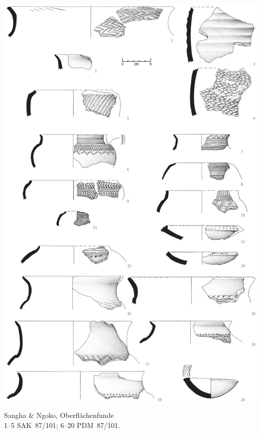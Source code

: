 \begin{pl}[H]
	\includegraphics{plt/Taf63.pdf}
	\vspace{.75em}\caption{\mbox{Sangha} \& \mbox{Ngoko}, Oberflächenfunde \\ 1--5 SAK~87/101; 6--20 PDM~87/101.}
	\label{pl:63}
\end{pl}

